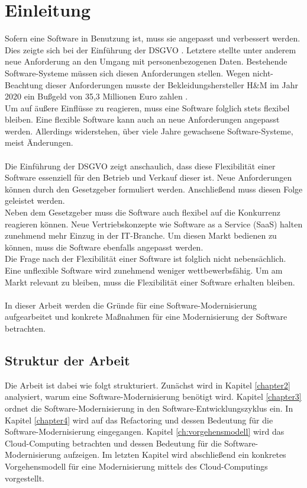 \chapter{Einleitung}
Sofern eine Software in Benutzung ist, muss sie angepasst und verbessert werden. \cite{lehman_understanding_1979}\\
Dies zeigte sich bei der Einführung der \acs{DSGVO} \cite{noauthor_datenschutz-grundverordnung_nodate}. Letztere stellte unter anderem neue Anforderung an den Umgang mit personenbezogenen Daten. Bestehende Software-Systeme müssen sich diesen Anforderungen stellen. Wegen nicht-Beachtung dieser Anforderungen musste der Bekleidungshersteller H\&M im Jahr 2020 ein Bußgeld von 35,3 Millionen Euro zahlen \cite{the_hamburg_commissioner_for_data_protection_and_freedom_of_information_353_2020}.\\
Um auf äußere Einflüsse zu reagieren, muss eine Software folglich stets flexibel bleiben. Eine flexible Software kann auch an neue Anforderungen angepasst werden. Allerdings widerstehen, über viele Jahre gewachsene Software-Systeme, meist Änderungen.\\\\
Die Einführung der DSGVO zeigt anschaulich, dass diese Flexibilität einer Software essenziell für den Betrieb und Verkauf dieser ist. Neue Anforderungen können durch den Gesetzgeber formuliert werden. Anschließend muss diesen Folge geleistet werden.\\
Neben dem Gesetzgeber muss die Software auch flexibel auf die Konkurrenz reagieren können. Neue Vertriebskonzepte wie Software as a Service (SaaS) halten zunehmend mehr Einzug in der IT-Branche. Um diesen Markt bedienen zu können, muss die Software ebenfalls angepasst werden.\\
Die Frage nach der Flexibilität einer Software ist folglich nicht nebensächlich. Eine unflexible Software wird zunehmend weniger wettbewerbsfähig. Um am Markt relevant zu bleiben, muss die Flexibilität einer Software erhalten bleiben.\\\\
In dieser Arbeit werden die Gründe für eine Software-Modernisierung aufgearbeitet und konkrete Maßnahmen für eine Modernisierung der Software betrachten. 

\section{Struktur der Arbeit}
Die Arbeit ist dabei wie folgt strukturiert. Zunächst wird in Kapitel \ref{chapter2} analysiert, warum eine Software-Modernisierung benötigt wird. Kapitel \ref{chapter3} ordnet die Software-Modernisierung in den Software-Entwicklungszyklus ein. In Kapitel \ref{chapter4} wird auf das Refactoring und dessen Bedeutung für die Software-Modernisierung eingegangen. Kapitel \ref{ch:vorgehensmodell} wird das Cloud-Computing betrachten und dessen Bedeutung für die Software-Modernisierung aufzeigen. Im letzten Kapitel wird abschließend ein konkretes Vorgehensmodell für eine Modernisierung mittels des Cloud-Computings vorgestellt.